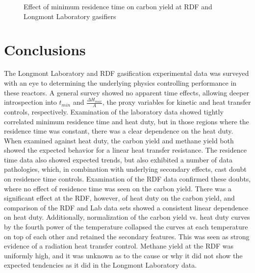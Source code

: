 \documentclass[11pt,twocolumn]{article}
\begin{document}
\begin{figure}[hp]

\caption{Effect of minimum residence time on carbon yield at RDF and Longmont Laboratory gasifiers}
\label{fig-Agg-Xg-dH-1450}
\end{figure}


\section*{Conclusions}

The Longmont Laboratory and RDF gasification experimental data was surveyed with an eye to determining the underlying physics controlling performance in these reactors.  A general survey showed no apparent time effects, allowing deeper introspection into $t_{min}$ and $\frac{\Delta H_{max}}{A}$, the proxy variables for kinetic and heat transfer controls, respectively.  Examination of the laboratory data showed tightly correlated minimum residence time and heat duty, but in those regions where the residence time was constant, there was a clear dependence on the heat duty.  When examined against heat duty, the carbon yield and methane yield both showed the expected behavior for a linear heat transfer resistance.  The residence time data also showed expected trends, but also exhibited a number of data pathologies, which, in combination with underlying secondary effects, cast doubt on residence time controls.  Examination of the RDF data confirmed these doubts, where no effect of residence time was seen on the carbon yield.  There was a significant effect at the RDF, however, of heat duty on the carbon yield, and comparison of the RDF and Lab data sets showed a consistent linear dependence on heat duty.  Additionally, normalization of the carbon yield vs. heat duty curves by the fourth power of the temperature collapsed the curves at each temperature on top of each other and retained the secondary features. This was seen as strong evidence of a radiation heat transfer control.  Methane yield at the RDF was uniformly high, and it was unknown as to the cause or why it did not show the expected tendencies as it did in the Longmont Laboratory data.
\end{document}
